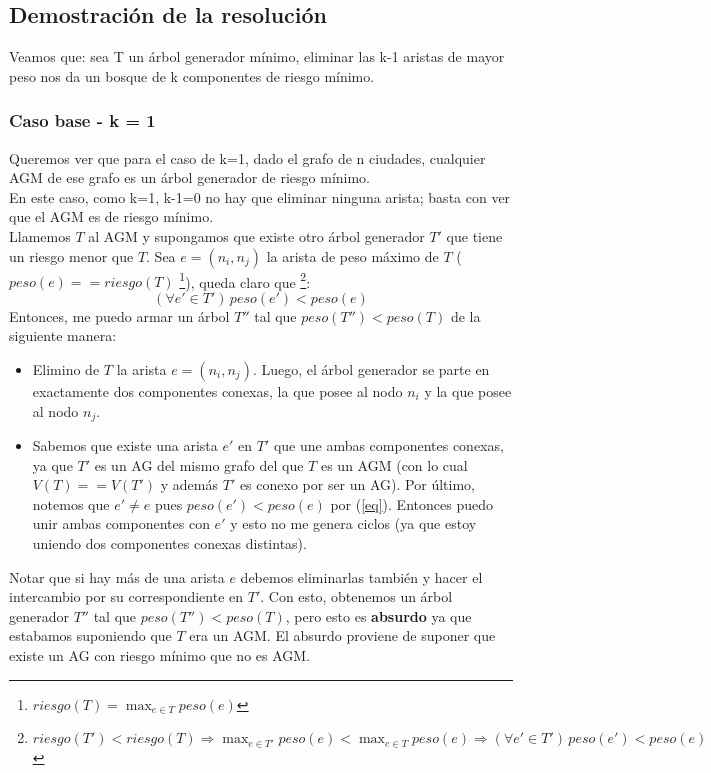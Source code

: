 \newpage

\subsection{Demostraci\'on de la resoluci\'on}

Veamos que: sea T un \'arbol generador m\'inimo, eliminar las k-1 aristas de mayor peso nos da un bosque de k componentes de riesgo m\'inimo.\\

\subsubsection{Caso base - k = 1}

Queremos ver que para el caso de k=1, dado el grafo de n ciudades, cualquier AGM de ese grafo es un \'arbol generador de riesgo m\'inimo.\\
En este caso, como k=1, k-1=0 no hay que eliminar ninguna arista; basta con ver que el AGM es de riesgo m\'inimo.\\

Llamemos $T$ al AGM y supongamos que existe otro \'arbol generador $T'$ que tiene un riesgo menor que $T$. Sea $e = (n_i, n_j)$ la arista de peso m\'aximo de $T$ ($peso(e) == riesgo(T)$ \footnote{$riesgo(T) = \max_{e \in T} peso(e)$}), queda claro que \footnote{$riesgo(T') < riesgo(T) \Rightarrow \max_{e \in T'} peso(e) < \max_{e \in T} peso(e) \Rightarrow (\forall e' \in T')\, peso(e') < peso(e)$}:
\begin{equation}\label{eq}
(\forall e' \in T')\, peso(e') < peso(e)
\end{equation}
Entonces, me puedo armar un \'arbol $T''$ tal que $peso(T'') < peso(T)$ de la siguiente manera:

\begin{itemize}
 \item Elimino de $T$ la arista $e = (n_i, n_j)$. Luego, el \'arbol generador se parte en exactamente dos componentes conexas, la que posee al nodo $n_i$ y la que posee al nodo $n_j$.
 \item Sabemos que existe una arista $e'$ en $T'$ que une ambas componentes conexas, ya que $T'$ es un AG del mismo grafo del que $T$ es un AGM (con lo cual $V(T) == V(T')$ y adem\'as $T'$ es conexo por ser un AG). Por \'ultimo, notemos que $e' \neq e$ pues $peso(e') < peso(e)$ por (\ref{eq}). Entonces puedo unir ambas componentes con $e'$ y esto no me genera ciclos (ya que estoy uniendo dos componentes conexas distintas).
\end{itemize}
Notar que si hay m\'as de una arista $e$ debemos eliminarlas tambi\'en y hacer el intercambio por su correspondiente en $T'$. 
Con esto, obtenemos un \'arbol generador $T''$ tal que $peso(T'') < peso(T)$, pero esto es \textbf{absurdo} ya que estabamos suponiendo que $T$ era un AGM. El absurdo proviene de suponer que existe un AG con riesgo m\'inimo que no es AGM.\\


